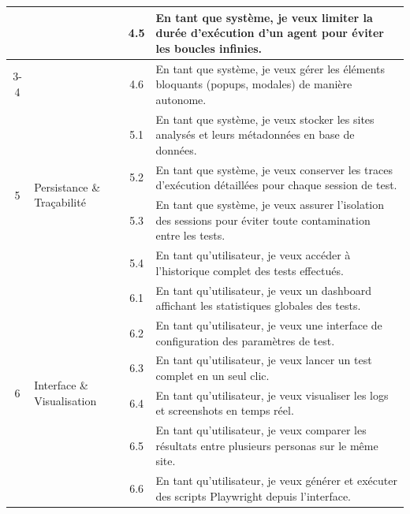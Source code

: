 \begin{center}
\begin{longtable}{|c|p{3.5cm}|c|p{7cm}|}
& & 4.5 & En tant que système, je veux limiter la durée d'exécution d'un agent pour éviter les boucles infinies. \\ \cline{3-4}

& & 4.6 & En tant que système, je veux gérer les éléments bloquants (popups, modales) de manière autonome. \\

\hline

\multirow{4}{*}{5} & 
\multirow{4}{3.5cm}{Persistance \& Traçabilité} 

& 5.1 & En tant que système, je veux stocker les sites analysés et leurs métadonnées en base de données. \\ \cline{3-4}

& & 5.2 & En tant que système, je veux conserver les traces d'exécution détaillées pour chaque session de test. \\ \cline{3-4}

& & 5.3 & En tant que système, je veux assurer l'isolation des sessions pour éviter toute contamination entre les tests. \\ \cline{3-4}

& & 5.4 & En tant qu'utilisateur, je veux accéder à l'historique complet des tests effectués. \\

\hline

\multirow{6}{*}{6} & 
\multirow{6}{3.5cm}{Interface \& Visualisation} 


& 6.1 & En tant qu'utilisateur, je veux un dashboard affichant les statistiques globales des tests. \\ \cline{3-4}

& & 6.2 & En tant qu'utilisateur, je veux une interface de configuration des paramètres de test. \\ \cline{3-4}

& & 6.3 & En tant qu'utilisateur, je veux lancer un test complet en un seul clic. \\ \cline{3-4}

& & 6.4 & En tant qu'utilisateur, je veux visualiser les logs et screenshots en temps réel. \\ \cline{3-4}

& & 6.5 & En tant qu'utilisateur, je veux comparer les résultats entre plusieurs personas sur le même site. \\ \cline{3-4}

& & 6.6 & En tant qu'utilisateur, je veux générer et exécuter des scripts Playwright depuis l'interface. \\

\hline

\end{longtable}
\end{center}

